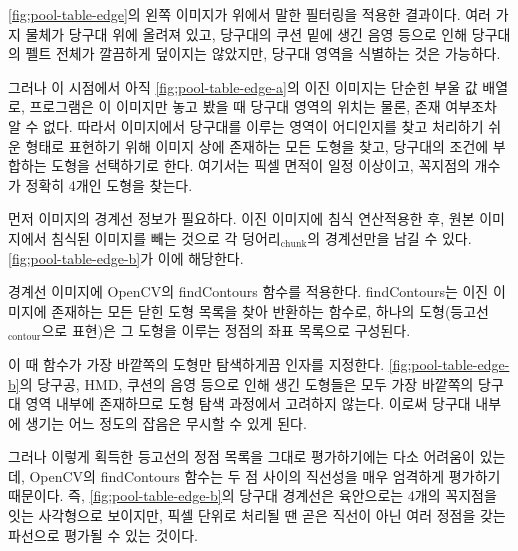 \documentclass[10pt]{oblivoir}
\begin{document}

\cref{fig;pool-table-edge}의 왼쪽 이미지가 위에서 말한 필터링을 적용한 결과이다. \footnotemark 여러 가지 물체가 당구대 위에 올려져 있고, 당구대의 쿠션 밑에 생긴 음영 등으로 인해 당구대의 펠트 전체가 깔끔하게 덮이지는 않았지만, 당구대 영역을 식별하는 것은 가능하다.

그러나 이 시점에서 아직 \cref{fig;pool-table-edge-a}의 이진 이미지는 단순힌 부울 값 배열로, 프로그램은 이 이미지만 놓고 봤을 때 당구대 영역의 위치는 물론, 존재 여부조차 알 수 없다. 따라서 이미지에서 당구대를 이루는 영역이 어디인지를 찾고 처리하기 쉬운 형태로 표현하기 위해 이미지 상에 존재하는 모든 도형을 찾고, 당구대의 조건에 부합하는 도형을 선택하기로 한다. 여기서는 픽셀 면적이 일정 이상이고, 꼭지점의 개수가 정확히 4개인 도형을 찾는다.

먼저 이미지의 경계선 정보가 필요하다. 이진 이미지에 침식 연산 적용한 후, 원본 이미지에서 침식된 이미지를 빼는 것으로 각 덩어리$_\text{chunk}$의 경계선만을 남길 수 있다. \cref{fig;pool-table-edge-b}가 이에 해당한다.

경계선 이미지에 OpenCV의 findContours 함수를 적용한다.\cite{findContours} findContours는 이진 이미지에 존재하는 모든 닫힌 도형 목록을 찾아 반환하는 함수로, 하나의 도형(등고선$_\text{contour}$으로 표현)은 그 도형을 이루는 정점의 좌표 목록으로 구성된다.

이 때 함수가 가장 바깥쪽의 도형만 탐색하게끔 인자를 지정한다. \cref{fig;pool-table-edge-b}의 당구공, HMD, 쿠션의 음영 등으로 인해 생긴 도형들은 모두 가장 바깥쪽의 당구대 영역 내부에 존재하므로 도형 탐색 과정에서 고려하지 않는다. 이로써 당구대 내부에 생기는 어느 정도의 잡음은 무시할 수 있게 된다.

그러나 이렇게 획득한 등고선의 정점 목록을 그대로 평가하기에는 다소 어려움이 있는데, OpenCV의 findContours 함수는 두 점 사이의 직선성을 매우 엄격하게 평가하기 때문이다. 즉, \cref{fig;pool-table-edge-b}의 당구대 경계선은 육안으로는 4개의 꼭지점을 잇는 사각형으로 보이지만, 픽셀 단위로 처리될 땐 곧은 직선이 아닌 여러 정점을 갖는 파선으로 평가될 수 있는 것이다.
\end{document}
